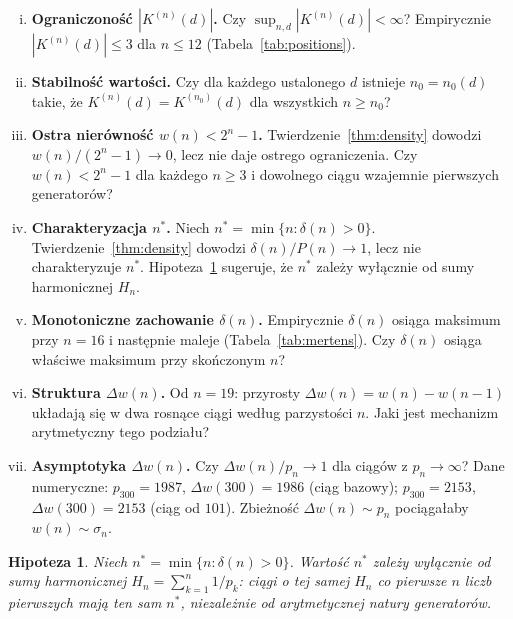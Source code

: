 \documentclass[11pt,a4paper]{amsart}
\theoremstyle{plain}
\newtheorem{conjecture}[theorem]{Hipoteza}
\theoremstyle{definition}
\theoremstyle{remark}
\begin{document}
\begin{enumerate}[(i)]

\item \textbf{Ograniczoność $|K^{(n)}(d)|$.}
Czy $\sup_{n,d} |K^{(n)}(d)| < \infty$?
Empirycznie $|K^{(n)}(d)| \leq 3$ dla $n \leq 12$
(Tabela~\ref{tab:positions}).

\item \textbf{Stabilność wartości.}
Czy dla każdego ustalonego $d$ istnieje $n_0 = n_0(d)$ takie,
że $K^{(n)}(d) = K^{(n_0)}(d)$ dla wszystkich $n \geq n_0$?

\item \textbf{Ostra nierówność $w(n) < 2^n - 1$.}
Twierdzenie~\ref{thm:density} dowodzi $w(n)/(2^n-1) \to 0$,
lecz nie daje ostrego ograniczenia.
Czy $w(n) < 2^n - 1$ dla każdego $n \geq 3$
i dowolnego ciągu wzajemnie pierwszych generatorów?

\item \textbf{Charakteryzacja $n^*$.}
Niech $n^* = \min\{n : \delta(n) > 0\}$.
Twierdzenie~\ref{thm:density} dowodzi $\delta(n)/P(n) \to 1$,
lecz nie charakteryzuje $n^*$.
Hipoteza~\ref{conj:harmonic} sugeruje, że $n^*$ zależy wyłącznie
od sumy harmonicznej $H_n$.

\item \textbf{Monotoniczne zachowanie $\delta(n)$.}
Empirycznie $\delta(n)$ osiąga maksimum przy $n = 16$
i następnie maleje (Tabela~\ref{tab:mertens}).
Czy $\delta(n)$ osiąga właściwe maksimum przy skończonym $n$?

\item \textbf{Struktura $\Delta w(n)$.}
Od $n = 19$: przyrosty $\Delta w(n) = w(n) - w(n-1)$
układają się w dwa rosnące ciągi według parzystości $n$.
Jaki jest mechanizm arytmetyczny tego podziału?

\item \textbf{Asymptotyka $\Delta w(n)$.}
Czy $\Delta w(n) / p_n \to 1$ dla ciągów z $p_n \to \infty$?
Dane numeryczne: $p_{300} = 1987$, $\Delta w(300) = 1986$
(ciąg bazowy); $p_{300} = 2153$, $\Delta w(300) = 2153$
(ciąg od $101$). Zbieżność $\Delta w(n) \sim p_n$ pociągałaby
$w(n) \sim \sigma_n$.

\end{enumerate}

\begin{conjecture}
\label{conj:harmonic}
Niech $n^* = \min\{n : \delta(n) > 0\}$.
Wartość $n^*$ zależy wyłącznie od sumy harmonicznej
$H_n = \sum_{k=1}^n 1/p_k$: ciągi o tej samej $H_n$
co pierwsze $n$ liczb pierwszych mają ten sam $n^*$,
niezależnie od arytmetycznej natury generatorów.
\end{conjecture}
\end{document}
